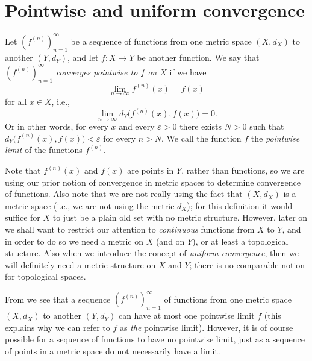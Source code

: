 \section{Pointwise and uniform convergence}\label{ii:sec:3.2}

\begin{defn}\label{ii:3.2.1}
  Let \((f^{(n)})_{n = 1}^\infty\) be a sequence of functions from one metric space \((X, d_X)\) to another \((Y, d_Y)\), and let \(f : X \to Y\) be another function.
  We say that \emph{\((f^{(n)})_{n = 1}^\infty\) converges pointwise to \(f\) on \(X\)} if we have
  \[
    \lim_{n \to \infty} f^{(n)}(x) = f(x)
  \]
  for all \(x \in X\), i.e.,
  \[
    \lim_{n \to \infty} d_Y\big(f^{(n)}(x), f(x)\big) = 0.
  \]
  Or in other words, for every \(x\) and every \(\varepsilon > 0\) there exists \(N > 0\) such that \(d_Y\big(f^{(n)}(x), f(x)\big) < \varepsilon\) for every \(n > N\).
  We call the function \(f\) the \emph{pointwise limit} of the functions \(f^{(n)}\).
\end{defn}

\begin{rmk}\label{ii:3.2.2}
  Note that \(f^{(n)}(x)\) and \(f(x)\) are points in \(Y\), rather than functions, so we are using our prior notion of convergence in metric spaces to determine convergence of functions.
  Also note that we are not really using the fact that \((X, d_X)\) is a metric space
  (i.e., we are not using the metric \(d_X\));
  for this definition it would suffice for \(X\) to just be a plain old set with no metric structure.
  However, later on we shall want to restrict our attention to \emph{continuous} functions from \(X\) to \(Y\), and in order to do so we need a metric on \(X\) (and on \(Y\)), or at least a topological structure.
  Also when we introduce the concept of \emph{uniform convergence}, then we will definitely need a metric structure on \(X\) and \(Y\);
  there is no comparable notion for topological spaces.
\end{rmk}

\begin{note}
  From  we see that a sequence \((f^{(n)})_{n = 1}^\infty\) of functions from one metric space \((X, d_X)\) to another \((Y, d_Y)\) can have at most one pointwise limit \(f\)
  (this explains why we can refer to \(f\) as \emph{the} pointwise limit).
  However, it is of course possible for a sequence of functions to have no pointwise limit, just as a sequence of points in a metric space do not necessarily have a limit.
\end{note}

